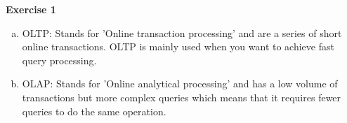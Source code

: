 {\bf \Huge Exercise 1}
\begin{enumerate}[a)]
	\item OLTP: Stands for 'Online transaction processing' and are a series of short online transactions. OLTP is mainly used when you want to achieve fast query processing.
	\item OLAP: Stands for 'Online analytical processing' and has a low volume of transactions but more complex queries which means that it requires fewer queries to do the same operation. 
\end{enumerate}
